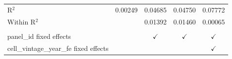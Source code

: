 \begin{tabular}{lcccc}
   R$^2$                                    & 0.00249        & 0.04685        & 0.04750        & 0.07772\\  
   Within R$^2$                             &                & 0.01392        & 0.01460        & 0.00065\\  
    \\
   panel\_id fixed effects                  &                & $\checkmark$   & $\checkmark$   & $\checkmark$\\   
   cell\_vintage\_year\_fe fixed effects    &                &                &                & $\checkmark$\\   
   \bottomrule
\end{tabular}
\par\endgroup


